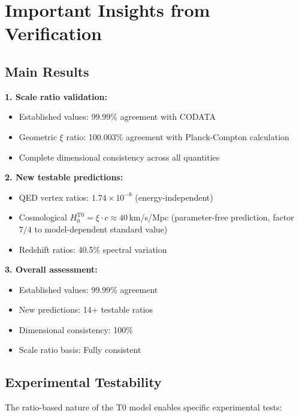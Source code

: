 \documentclass[12pt,a4paper]{article}
\begin{document}
\section{Important Insights from Verification}

\subsection{Main Results}

\begin{tcolorbox}[colback=green!5!white,colframe=green!75!black,title=Main Results of T0 Verification]
	\textbf{1. Scale ratio validation:}
	\begin{itemize}
		\item Established values: 99.99\% agreement with CODATA
		\item Geometric $\xi$ ratio: 100.003\% agreement with Planck-Compton calculation
		\item Complete dimensional consistency across all quantities
	\end{itemize}
	
	\textbf{2. New testable predictions:}
	\begin{itemize}
		\item QED vertex ratios: $1.74 \times 10^{-8}$ (energy-independent)
		\item Cosmological $H_0^{\text{T0}} = \xi \cdot c \approx 40\,$km/s/Mpc (parameter-free prediction, factor $7/4$ to model-dependent standard value)
		\item Redshift ratios: 40.5\% spectral variation
	\end{itemize}
	
	\textbf{3. Overall assessment:}
	\begin{itemize}
		\item Established values: 99.99\% agreement
		\item New predictions: 14+ testable ratios
		\item Dimensional consistency: 100\%
		\item Scale ratio basis: Fully consistent
	\end{itemize}
\end{tcolorbox}

\subsection{Experimental Testability}

The ratio-based nature of the T0 model enables specific experimental tests:
\end{document}
